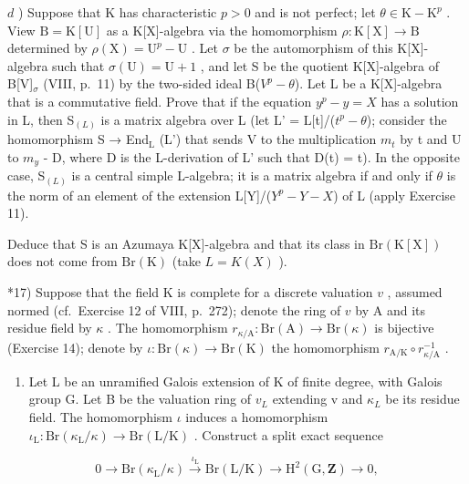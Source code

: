 \(d\) ) Suppose that K has characteristic \(p > 0\) and is not perfect; let \(\theta \in \mathrm{K} - \mathrm{K}^p\) . View \(\mathrm{B} = \mathrm{K}[\mathrm{U}]\) as a K{[}X{]}-algebra via the homomorphism \(\rho : \mathrm{K}[\mathrm{X}] \to \mathrm{B}\) determined by \(\rho (\mathrm{X}) = \mathrm{U}^p - \mathrm{U}\) . Let \(\sigma\) be the automorphism of this K{[}X{]}-algebra such that \(\sigma (\mathrm{U}) = \mathrm{U} + 1\) , and let S be the quotient K{[}X{]}-algebra of B{[}V{]}\(_{\sigma}\) (VIII, p.~11) by the two-sided ideal B(\(V^{p} - \theta\)). Let L be a K{[}X{]}-algebra that is a commutative field. Prove that if the equation \(y^p - y = X\) has a solution in L, then S\(_{(L)}\) is a matrix algebra over L (let L' = L{[}t{]}/(\(t^{p} - \theta\)); consider the homomorphism S → End\(_{\mathrm{L}}\) (L') that sends V to the multiplication \(m_t\) by t and U to \(m_y\) - D, where D is the L-derivation of L' such that D(t) = t). In the opposite case, S\(_{(L)}\) is a central simple L-algebra; it is a matrix algebra if and only if \(\theta\) is the norm of an element of the extension L{[}Y{]}/(\(Y^{p} - Y - X\)) of L (apply Exercise 11).

Deduce that S is an Azumaya K{[}X{]}-algebra and that its class in \(\mathrm{Br}(\mathrm{K}[\mathrm{X}])\) does not come from \(\mathrm{Br}(\mathrm{K})\) (take \(L = K(X)\) ).

*17) Suppose that the field K is complete for a discrete valuation \(v\) , assumed normed (cf.~Exercise 12 of VIII, p.~272); denote the ring of \(v\) by A and its residue field by \(\kappa\) . The homomorphism \(r_{\kappa / \mathrm{A}}: \mathrm{Br}(\mathrm{A}) \to \mathrm{Br}(\kappa)\) is bijective (Exercise 14); denote by \(\iota: \mathrm{Br}(\kappa) \to \mathrm{Br}(\mathrm{K})\) the homomorphism \(r_{\mathrm{A / K}} \circ r_{\kappa / \mathrm{A}}^{-1}\) .

\begin{enumerate}
\def\labelenumi{\alph{enumi})}
\tightlist
\item
  Let L be an unramified Galois extension of K of finite degree, with Galois group G. Let B be the valuation ring of \(v_{L}\) extending v and \(\kappa_{L}\) be its residue field. The homomorphism \(\iota\) induces a homomorphism \(\iota_{\mathrm{L}} : \mathrm{Br}(\kappa_{\mathrm{L}}/\kappa) \to \mathrm{Br}(\mathrm{L}/\mathrm{K})\) . Construct a split exact sequence
\end{enumerate}

\[
0 \to \mathrm{Br} (\kappa_ {\mathrm{L}} / \kappa) \xrightarrow {\iota_ {\mathrm{L}}} \mathrm{Br} (\mathrm{L} / \mathrm{K}) \to \mathrm{H} ^ {2} (\mathrm{G}, \mathbf {Z}) \to 0,
\]

